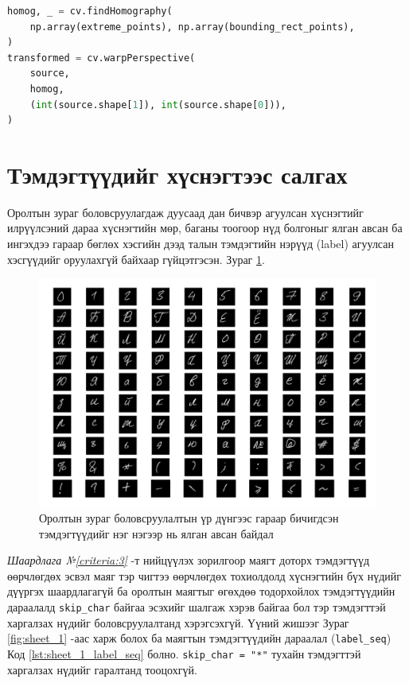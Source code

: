 \begin{lstlisting}[caption={Харах өнцгийн хувиргалтыг арилгах}, label={lst:deskew}, language=Python]
homog, _ = cv.findHomography(
	np.array(extreme_points), np.array(bounding_rect_points),
)
transformed = cv.warpPerspective(
	source,
	homog,
	(int(source.shape[1]), int(source.shape[0])),
)
\end{lstlisting}

\section{Тэмдэгтүүдийг хүснэгтээс салгах}

Оролтын зураг боловсруулагдаж дуусаад дан бичвэр агуулсан хүснэгтийг илрүүлсэний дараа хүснэгтийн мөр, баганы тоогоор нүд болгоныг ялган авсан ба ингэхдээ гараар бөглөх хэсгийн дээд талын тэмдэгтийн нэрүүд (label) агуулсан хэсгүүдийг оруулахгүй байхаар гүйцэтгэсэн. Зураг \ref{fig:sheet_final_segmented}.

\begin{figure}[ht]
	\centering
	\includegraphics[width=1\linewidth]{images/sheet_final_segmented}
	\caption{Оролтын зураг боловсруулалтын үр дүнгээс гараар бичигдсэн тэмдэгтүүдийг нэг нэгээр нь ялган авсан байдал}
	\label{fig:sheet_final_segmented}
\end{figure}

\textit{Шаардлага №\ref{criteria:3}} -т нийцүүлэх зорилгоор маягт доторх тэмдэгтүүд өөрчлөгдөх эсвэл маяг тэр чигтээ өөрчлөгдөх тохиолдолд хүснэгтийн бүх нүдийг дүүргэх шаардлагагүй ба оролтын маягтыг өгөхдөө тодорхойлох тэмдэгтүүдийн дараалалд \texttt{skip\_char} байгаа эсэхийг шалгаж хэрэв байгаа бол тэр тэмдэгттэй харгалзах нүдийг боловсруулалтанд хэрэгсэхгүй. Үүний жишээг Зураг \ref{fig:sheet_1} -аас харж болох ба маягтын тэмдэгтүүдийн дараалал (\texttt{label\_seq}) Код \ref{lst:sheet_1_label_seq} болно. \texttt{skip\_char = "*"} тухайн тэмдэгттэй харгалзах нүдийг гаралтанд тооцохгүй.


